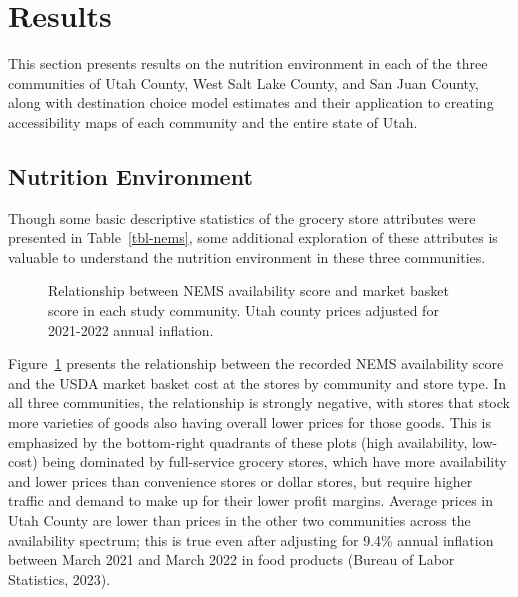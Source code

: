 \documentclass[
  letterpaper,
  number,
  review,
  doubleblind,
  3p]{elsarticle}
\begin{document}

\section{Results}\label{sec-results}

This section presents results on the nutrition environment in each of
the three communities of Utah County, West Salt Lake County, and San
Juan County, along with destination choice model estimates and their
application to creating accessibility maps of each community and the
entire state of Utah.

\subsection{Nutrition Environment}\label{sec-nems}

Though some basic descriptive statistics of the grocery store attributes
were presented in Table~\ref{tbl-nems}, some additional exploration of
these attributes is valuable to understand the nutrition environment in
these three communities.

\begin{figure}


\caption{\label{fig-nems-market-avail}Relationship between NEMS
availability score and market basket score in each study community. Utah
county prices adjusted for 2021-2022 annual inflation.}

\end{figure}%

Figure~\ref{fig-nems-market-avail} presents the relationship between the
recorded NEMS availability score and the USDA market basket cost at the
stores by community and store type. In all three communities, the
relationship is strongly negative, with stores that stock more varieties
of goods also having overall lower prices for those goods. This is
emphasized by the bottom-right quadrants of these plots (high
availability, low-cost) being dominated by full-service grocery stores,
which have more availability and lower prices than convenience stores or
dollar stores, but require higher traffic and demand to make up for
their lower profit margins. Average prices in Utah County are lower than
prices in the other two communities across the availability spectrum;
this is true even after adjusting for 9.4\% annual inflation between
March 2021 and March 2022 in food products (Bureau of Labor Statistics,
2023).
\end{document}
